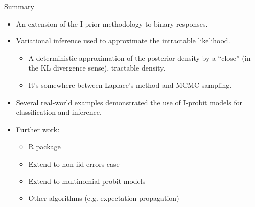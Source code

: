 \begin{frame}[label=summary]{Summary}
  \vspace{-10pt}
  \begin{itemize}\setlength\itemsep{0.8em}
    \item An extension of the I-prior methodology to binary responses.
    \item Variational inference used to approximate the intractable likelihood.
    \begin{itemize}
      \item A deterministic approximation of the posterior density by a ``close'' (in the KL divergence sense), tractable density.
      \item It's somewhere between Laplace's method and MCMC sampling. 
    \end{itemize}
    \item Several real-world examples demonstrated the use of I-probit models for classification and inference.
    \item Further work:
    \begin{itemize}
      \item R package 
      \item Extend to non-iid errors case
      \item Extend to multinomial probit models
      \item Other algorithms (e.g. expectation propagation)
    \end{itemize}
  \end{itemize}
\end{frame}
